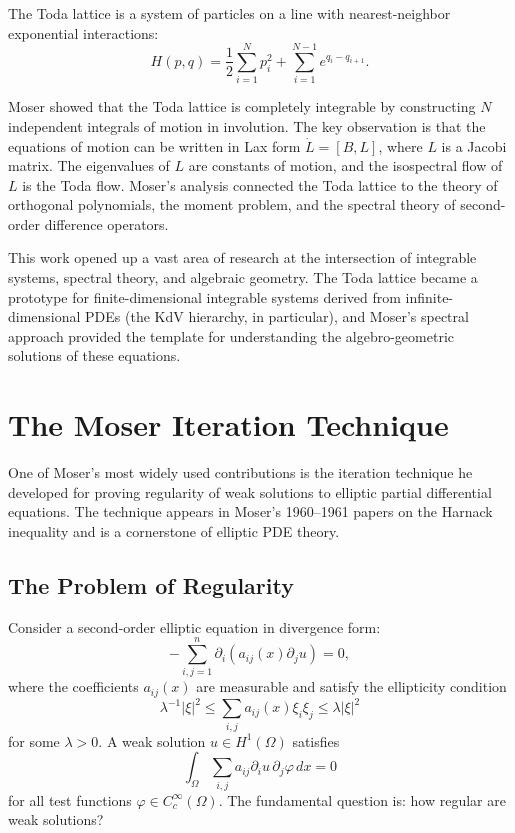 The Toda lattice is a system of particles on a line with nearest-neighbor exponential interactions:
\[
H(p,q) = \frac{1}{2}\sum_{i=1}^N p_i^2 + \sum_{i=1}^{N-1} e^{q_i - q_{i+1}}.
\]

Moser showed that the Toda lattice is completely integrable by constructing $N$ independent integrals of motion in involution. The key observation is that the equations of motion can be written in Lax form $\dot{L} = [B, L]$, where $L$ is a Jacobi matrix. The eigenvalues of $L$ are constants of motion, and the isospectral flow of $L$ is the Toda flow. Moser's analysis connected the Toda lattice to the theory of orthogonal polynomials, the moment problem, and the spectral theory of second-order difference operators.

This work opened up a vast area of research at the intersection of integrable systems, spectral theory, and algebraic geometry. The Toda lattice became a prototype for finite-dimensional integrable systems derived from infinite-dimensional PDEs (the KdV hierarchy, in particular), and Moser's spectral approach provided the template for understanding the algebro-geometric solutions of these equations.

\section{The Moser Iteration Technique}

One of Moser's most widely used contributions is the iteration technique he developed for proving regularity of weak solutions to elliptic partial differential equations. The technique appears in Moser's 1960--1961 papers on the Harnack inequality and is a cornerstone of elliptic PDE theory.

\subsection{The Problem of Regularity}

Consider a second-order elliptic equation in divergence form:
\[
-\sum_{i,j=1}^n \partial_i(a_{ij}(x)\partial_j u) = 0,
\]
where the coefficients $a_{ij}(x)$ are measurable and satisfy the ellipticity condition
\[
\lambda^{-1}|\xi|^2 \leq \sum_{i,j} a_{ij}(x) \xi_i \xi_j \leq \lambda |\xi|^2
\]
for some $\lambda > 0$. A weak solution $u \in H^1(\Omega)$ satisfies
\[
\int_\Omega \sum_{i,j} a_{ij} \partial_i u \, \partial_j \varphi \, dx = 0
\]
for all test functions $\varphi \in C_c^\infty(\Omega)$. The fundamental question is: how regular are weak solutions?

